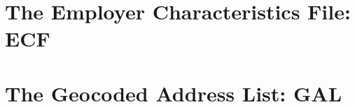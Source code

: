 %
%
\section{The Employer Characteristics File\label{cha:ecf}: ECF}



%
%

\section{The Geocoded Address List\label{cha:gal}: GAL}


%
%



